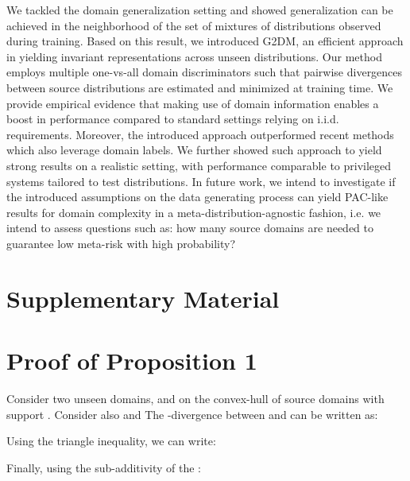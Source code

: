 \documentclass{article}
\begin{document}
We tackled the domain generalization setting and showed generalization can be achieved in the neighborhood of the set of mixtures of distributions observed during training. Based on this result, we introduced G2DM, an efficient approach in yielding invariant representations across unseen distributions. Our method employs multiple one-vs-all domain discriminators such that pairwise divergences between source distributions are estimated and minimized at training time. We provide empirical evidence that making use of domain information enables a boost in performance compared to standard settings relying on i.i.d. requirements. Moreover, the introduced approach outperformed recent methods which also leverage domain labels. We further showed  such approach to yield strong results on a realistic setting, with performance comparable to privileged systems tailored to test distributions. In future work, we intend to investigate if the introduced assumptions on the data generating process can yield PAC-like results for domain complexity in a meta-distribution-agnostic fashion, i.e. we intend to assess questions such as: how many source domains are needed to guarantee low meta-risk with high probability?




















\clearpage
\appendix
\section*{Supplementary Material}

\section{Proof of Proposition 1}
Consider two unseen domains,  and  on the convex-hull  of  source domains with support . Consider also  and 
The -divergence between  and  can be written as:

Using the triangle inequality, we can write:


Finally, using the sub-additivity of the :
\end{document}
